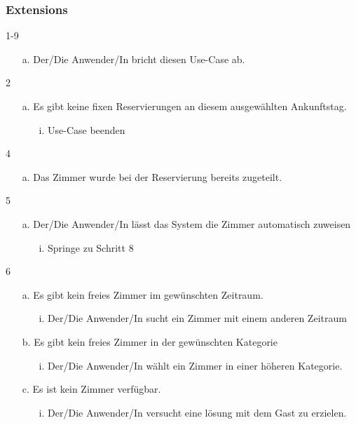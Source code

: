 \documentclass[./detailed_overview_usecases.tex]{subfiles}
\begin{document}
    \subsubsection*{Extensions}
    \item 1-9 \begin{itemize}
                   \item[a.] Der/Die Anwender/In bricht diesen Use-Case ab.
    \end{itemize}
    \item 2 \begin{itemize}
                \item[a.] Es gibt keine fixen Reservierungen an diesem ausgewählten Ankunftstag.
                \begin{itemize}
                    \item[i.] Use-Case beenden
                \end{itemize}
    \end{itemize}
    \item 4 \begin{itemize}
                \item[a.] Das Zimmer wurde bei der Reservierung bereits zugeteilt.
    \end{itemize}
    \item 5 \begin{itemize}
                \item[a.] Der/Die Anwender/In lässt das System die Zimmer automatisch zuweisen
                \begin{itemize}
                    \item[i.] Springe zu Schritt 8
                \end{itemize}
    \end{itemize}
    \item 6 \begin{itemize}
                \item[a.] Es gibt kein freies Zimmer im gewünschten Zeitraum.
                \begin{itemize}
                    \item[i.] Der/Die Anwender/In sucht ein Zimmer mit einem anderen Zeitraum
                \end{itemize}
                \item[b.] Es gibt kein freies Zimmer in der gewünschten Kategorie
                \begin{itemize}
                    \item[i.] Der/Die Anwender/In wählt ein Zimmer in einer höheren Kategorie.
                \end{itemize}
                \item[c.] Es ist kein Zimmer verfügbar.
                \begin{itemize}
                    \item[i.] Der/Die Anwender/In versucht eine lösung mit dem Gast zu erzielen.
                \end{itemize}
    \end{itemize}
\end{document}
